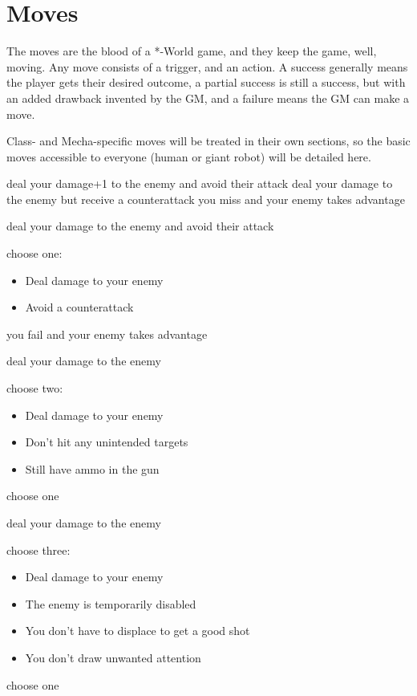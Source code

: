 \section{Moves}
The moves are the blood of a *-World game, and they keep the game, well, moving. Any move consists of a trigger, and an action. A success generally means the player gets their desired outcome, a partial success is still a success, but with an added drawback invented by the GM, and a failure means the GM can make a move.

Class- and Mecha-specific moves will be treated in their own sections, so the basic moves accessible to everyone (human or giant robot) will be detailed here.

{deal your damage+1 to the enemy and avoid their attack}
{deal your damage to the enemy but receive a counterattack}
{you miss and your enemy takes advantage}

{deal your damage to the enemy and avoid their attack}
{choose one:
\begin{itemize}
\item Deal damage to your enemy
\item Avoid a counterattack
\end{itemize}}
{you fail and your enemy takes advantage}

{deal your damage to the enemy}
{choose two:
\begin{itemize}
\item Deal damage to your enemy
\item Don't hit any unintended targets
\item Still have ammo in the gun
\end{itemize}}
{choose one}

{deal your damage to the enemy}
{choose three:
\begin{itemize}
\item Deal damage to your enemy
\item The enemy is temporarily disabled
\item You don't have to displace to get a good shot
\item You don't draw unwanted attention
\end{itemize}}
{choose one}